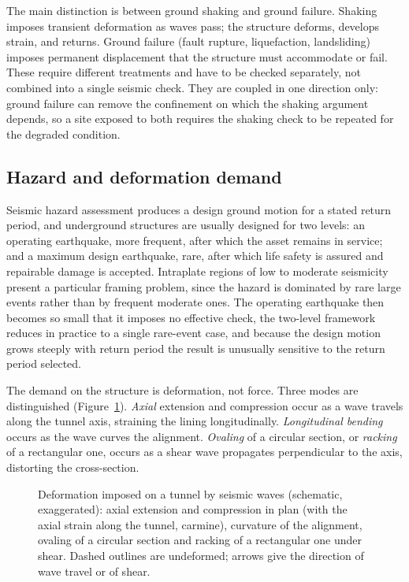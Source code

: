 The main distinction is between ground shaking and ground failure.
Shaking imposes transient deformation as waves pass; the structure deforms,
develops strain, and returns. Ground failure (fault rupture, liquefaction,
landsliding) imposes permanent displacement that the structure must
accommodate or fail. These require different treatments and have to be checked
separately, not combined into a single seismic check. They are coupled in one direction only: ground failure
can remove the confinement on which the shaking argument depends, so a site
exposed to both requires the shaking check to be repeated for the degraded
condition.

\subsection{Hazard and deformation demand}
\label{sec:hazard-deformation}

Seismic hazard assessment produces a design ground motion for a stated return
period, and underground structures are usually designed for two levels: an
operating earthquake, more frequent, after which the asset remains in service;
and a maximum design earthquake, rare, after which life safety is assured and
repairable damage is accepted. Intraplate regions of low to moderate
seismicity present a particular framing problem, since the hazard is dominated
by rare large events rather than by frequent moderate ones. The operating
earthquake then becomes so small that it imposes no effective check, the two-level
framework reduces in practice to a single rare-event case, and because the
design motion grows steeply with return period the result is unusually
sensitive to the return period selected.

The demand on the structure is deformation, not force. Three modes are
distinguished (Figure~\ref{fig:seismic-modes}). \emph{Axial} extension and compression occur as a wave travels
along the tunnel axis, straining the lining longitudinally.
\emph{Longitudinal bending} occurs as the wave curves the alignment.
\emph{Ovaling} of a circular section, or \emph{racking} of a rectangular one,
occurs as a shear wave propagates perpendicular to the axis, distorting the
cross-section.

\begin{figure}[htbp]
\centering
{}
\caption{Deformation imposed on a tunnel by seismic waves (schematic, exaggerated): axial extension and compression in plan (with the axial strain along the tunnel, carmine), curvature of the alignment, ovaling of a circular section and racking of a rectangular one under shear. Dashed outlines are undeformed; arrows give the direction of wave travel or of shear.}
\label{fig:seismic-modes}
\end{figure}

